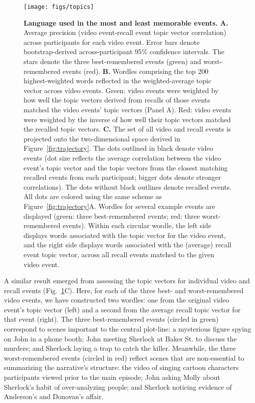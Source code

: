 \documentclass{article}
\begin{document}
\begin{figure}[tp]
\centering
\texttt{[image: figs/topics]}
\caption{\small \textbf{Language used in the most and least memorable events.} \textbf{A.} Average precision (video event-recall event topic vector correlation) across participants for each video event.  Error bars denote bootstrap-derived across-participant 95\% confidence intervals.  The stars denote the three best-remembered events (green) and worst-remembered events (red).  \textbf{B.} Wordles comprising the top 200 highest-weighted words reflected in the weighted-average topic vector across video events.  Green: video events were weighted by how well the topic vectors derived from recalls of those events matched the video events' topic vectors (Panel A).  Red: video events were weighted by the inverse of how well their topic vectors matched the recalled topic vectors.  \textbf{C.}  The set of all video and recall events is projected onto the two-dimensional space derived in Figure~\ref{fig:trajectory}.  The dots outlined in black denote video events (dot size reflects the average correlation between the video event's topic vector and the topic vectors from the closest matching recalled events from each participant; bigger dots denote stronger correlations).  The dots without black outlines denote recalled events.  All dots are colored using the same scheme as Figure~\ref{fig:trajectory}A.  Wordles for several example events are displayed (green: three best-remembered events; red: three worst-remembered events).  Within each circular wordle, the left side displays words associated with the topic vector for the video event, and the right side displays words associated with the (average) recall event topic vector, across all recall events matched to the given video event.}
\label{fig:topics}
\end{figure}

A similar result emerged from assessing the topic vectors for individual video and recall events (Fig.~\ref{fig:topics}C).  Here, for each of the three best- and worst-remembered video events, we have constructed two wordles: one from the original video event's topic vector (left) and a second from the average recall topic vector for that event (right).  The three best-remembered events (circled in green) correspond to scenes important to the central plot-line: a mysterious figure spying on John in a phone booth; John meeting Sherlock at Baker St. to discuss the murders; and Sherlock laying a trap to catch the killer.  Meanwhile, the three worst-remembered events (circled in red) reflect scenes that are non-essential to summarizing the narrative's structure: the video of singing cartoon characters participants viewed prior to the main episode; John asking Molly about Sherlock's habit of over-analyzing people; and Sherlock noticing evidence of Anderson's and Donovan's affair.
\end{document}
